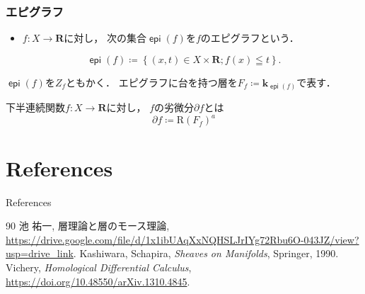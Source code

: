 \documentclass[dvipdfmx,12pt,aspectratio=169,leqno]{beamer}%
\newcommand{\rr}{\mathbf{R}}
\newcommand{\kk}{\mathbf{k}}
\newcommand{\p}{\partial}
\numberwithin{equation}{subsection}
\newcommand{\epi}{\mathop{\mathsf{epi}}\nolimits}
\theoremstyle{mystyle}
\begin{document}
\begin{frame}
    \frametitle{エピグラフ}
    
    \begin{definition}
        \begin{itemize}
            \item \(f\colon X\to \rr\)に対し，
            次の集合\(\epi(f)\)を\(f\)のエピグラフという．
        \end{itemize}
        \[
            \epi(f)\coloneqq
            \left\{(x,t)\in X\times \rr;f(x)\leqq t\right\}.
        \]
    \end{definition}
    \(\epi(f)\)を\(Z_f\)ともかく．
    エピグラフに台を持つ層を\(
            F_{f}\coloneqq\kk_{\epi(f)}\)で表す．
    \begin{definition}[ホモロジカル劣微分]
        下半連続関数\(f\colon X\to \rr\)に対し，
        \(f\)の劣微分\(\p f\)とは
        \[\p f\coloneqq \mathrm{R}(F_{f})^{a}\]
    \end{definition}

\end{frame}


\section{References}

\begin{frame}[allowframebreaks]{References}
    \begin{thebibliography}{90}\beamertemplatetextbibitems
         池 祐一, 
        層理論と層のモース理論, \url{https://drive.google.com/file/d/1x1ibUAqXxNQHSLJrIYg72Rbu6O-043JZ/view?usp=drive_link}.
         Kashiwara, Schapira, 
        \textit{Sheaves on Manifolds}, Springer, 1990.
         Vichery, 
        \textit{Homological Differential Calculus}, \url{https://doi.org/10.48550/arXiv.1310.4845}.
    \end{thebibliography}
\end{frame}

\end{document}

